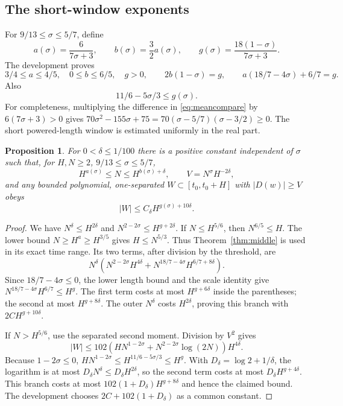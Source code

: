 \documentclass[11pt,a4paper,oneside]{article}
\newtheorem{proposition}[theorem]{Proposition}
\theoremstyle{definition}
\numberwithin{equation}{section}
\begin{document}
\subsection{The short-window exponents}
For $9/13\le\sigma\le5/7$, define
\[
 a(\sigma)=\frac6{7\sigma+3},\qquad b(\sigma)=\frac32a(\sigma),\qquad
 g(\sigma)=\frac{18(1-\sigma)}{7\sigma+3}.
\]
The development proves
\[
 3/4\le a\le4/5,\quad0\le b\le6/5,\quad g>0,
 \qquad2b(1-\sigma)=g,\qquad a(18/7-4\sigma)+6/7=g.
\]
Also
\begin{equation}\label{eq:meancompare}
 11/6-5\sigma/3\le g(\sigma).
\end{equation}
For completeness, multiplying the difference in \eqref{eq:meancompare}
by $6(7\sigma+3)>0$ gives
$70\sigma^2-155\sigma+75
=70(\sigma-5/7)(\sigma-3/2)\ge0$.
The short powered-length window is estimated uniformly in the real part.
\begin{proposition}\label{prop:shortwindow}
For $0<\delta\le1/100$ there is a positive constant independent of $\sigma$
such that, for $H,N\ge2$, $9/13\le\sigma\le5/7$,
\[
 H^{a(\sigma)}\le N\le H^{b(\sigma)+\delta},\qquad
 V=N^\sigma H^{-2\delta},
\]
and any bounded polynomial, one-separated $W\subset[t_0,t_0+H]$ with
$|D(w)|\ge V$ obeys
\[
 |W|\le C_\delta H^{g(\sigma)+10\delta}.
\]
\end{proposition}
\begin{proof}
We have $N^\delta\le H^{2\delta}$ and
$N^{2-2\sigma}\le H^{g+2\delta}$.
If $N\le H^{5/6}$, then $N^{6/5}\le H$.
The lower bound $N\ge H^a\ge H^{3/5}$ gives $H\le N^{5/3}$.
Thus Theorem~\ref{thm:middle} is used in its exact time range. Its two
terms, after division by the threshold, are
\[
 N^\delta\left(N^{2-2\sigma}H^{4\delta}
             +N^{18/7-4\sigma}H^{6/7+8\delta}\right).
\]
Since $18/7-4\sigma\le0$, the lower length bound and the scale identity
give $N^{18/7-4\sigma}H^{6/7}\le H^g$.
The first term costs at most $H^{g+6\delta}$ inside the parentheses;
the second at most $H^{g+8\delta}$. The outer $N^\delta$ costs
$H^{2\delta}$, proving this branch with $2C H^{g+10\delta}$.

If $N>H^{5/6}$, use the separated second moment. Division by
$V^2$ gives
\[
 |W|\le102\left(HN^{1-2\sigma}+N^{2-2\sigma}\log(2N)\right)H^{4\delta}.
\]
Because $1-2\sigma\le0$,
$HN^{1-2\sigma}\le H^{11/6-5\sigma/3}\le H^g$.
With $D_\delta=\log2+1/\delta$, the logarithm is at most
$D_\delta N^\delta\le D_\delta H^{2\delta}$, so the second term costs
at most $D_\delta H^{g+4\delta}$. This branch costs at most
$102(1+D_\delta)H^{g+8\delta}$ and hence the claimed bound.
The development chooses $2C+102(1+D_\delta)$ as a common constant.
\end{proof}
\end{document}
